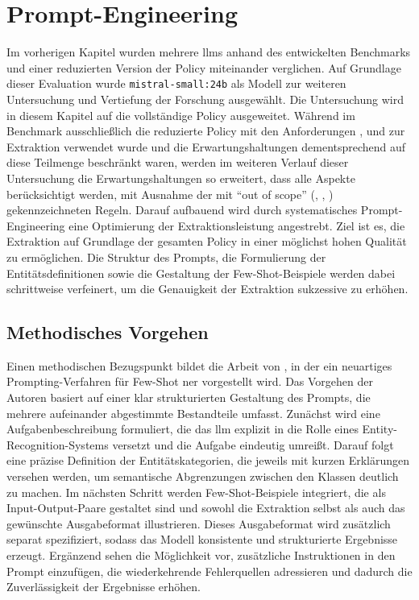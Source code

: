 
\chapter{Prompt-Engineering}\label{ch:prompt-engineering}

Im vorherigen Kapitel wurden mehrere \glspl{llm} anhand des entwickelten Benchmarks und einer reduzierten Version der Policy miteinander verglichen.
Auf Grundlage dieser Evaluation wurde \texttt{mistral-small:24b} als Modell zur weiteren Untersuchung und Vertiefung der Forschung ausgewählt.
Die Untersuchung wird in diesem Kapitel auf die vollständige Policy ausgeweitet.
Während im Benchmark ausschließlich die reduzierte Policy mit den Anforderungen ,  und  zur Extraktion verwendet wurde und die Erwartungshaltungen dementsprechend auf diese Teilmenge beschränkt waren, werden im weiteren Verlauf dieser Untersuchung die Erwartungshaltungen so erweitert, dass alle Aspekte berücksichtigt werden, mit Ausnahme der mit \enquote{out of scope} (, , ) gekennzeichneten Regeln.
Darauf aufbauend wird durch systematisches Prompt-Engineering eine Optimierung der Extraktionsleistung angestrebt.
Ziel ist es, die Extraktion auf Grundlage der gesamten Policy in einer möglichst hohen Qualität zu ermöglichen.
Die Struktur des Prompts, die Formulierung der Entitätsdefinitionen sowie die Gestaltung der Few-Shot-Beispiele werden dabei schrittweise verfeinert, um die Genauigkeit der Extraktion sukzessive zu erhöhen.


\section{Methodisches Vorgehen}\label{sec:methodisches-vorgehen}

Einen methodischen Bezugspunkt bildet die Arbeit von \citeauthor{cheng_novel_2024}\autocite{cheng_novel_2024}, in der ein neuartiges Prompting-Verfahren für Few-Shot \gls{ner} vorgestellt wird.
Das Vorgehen der Autoren basiert auf einer klar strukturierten Gestaltung des Prompts, die mehrere aufeinander abgestimmte Bestandteile umfasst.
Zunächst wird eine Aufgabenbeschreibung formuliert, die das \gls{llm} explizit in die Rolle eines Entity-Recognition-Systems versetzt und die Aufgabe eindeutig umreißt.
Darauf folgt eine präzise Definition der Entitätskategorien, die jeweils mit kurzen Erklärungen versehen werden, um semantische Abgrenzungen zwischen den Klassen deutlich zu machen.
Im nächsten Schritt werden Few-Shot-Beispiele integriert, die als Input-Output-Paare gestaltet sind und sowohl die Extraktion selbst als auch das gewünschte Ausgabeformat illustrieren.
Dieses Ausgabeformat wird zusätzlich separat spezifiziert, sodass das Modell konsistente und strukturierte Ergebnisse erzeugt.
Ergänzend sehen \citeauthor{cheng_novel_2024}\autocite{cheng_novel_2024} die Möglichkeit vor, zusätzliche Instruktionen in den Prompt einzufügen, die wiederkehrende Fehlerquellen adressieren und dadurch die Zuverlässigkeit der Ergebnisse erhöhen\autocite{cheng_novel_2024}.


